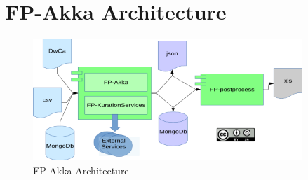 \documentclass{article}
\begin{document}
\section{FP-Akka Architecture}

\begin{figure}[b!]


\includegraphics[width=4in]{Architecturev4.png}
\caption{FP-Akka Architecture}
\label{fig:architecture}
\end{figure}
\end{document}
